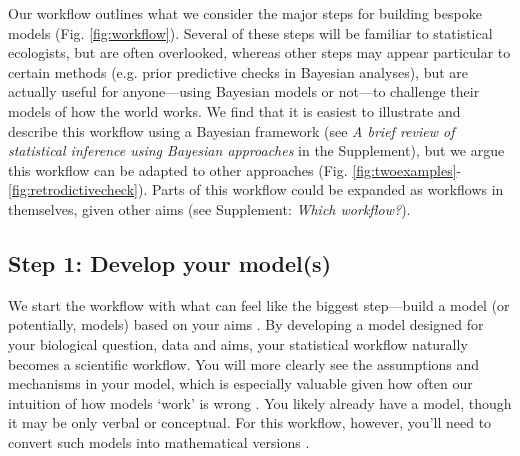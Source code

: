 \documentclass[11pt]{article}
\newcommand{\R}[1]{\label{}\linelabel{#1}}
\begin{document}
Our workflow outlines what we consider the major steps for building bespoke models (Fig. \ref{fig:workflow}). Several of these steps will be familiar to statistical ecologists, but are often overlooked, whereas other steps may appear particular to certain methods (e.g. prior predictive checks in Bayesian analyses), but are actually useful for anyone---using Bayesian models or not---to challenge their models of how the world works. We find that it is easiest to illustrate and describe \R{beyondMCMC2} this workflow using a Bayesian framework (see \emph{A brief review of statistical inference using Bayesian approaches} in the Supplement), but we argue this workflow can be adapted to other\R{beyondMCMC3} approaches (Fig. \ref{fig:twoexamples}-\ref{fig:retrodictivecheck}).
Parts of this workflow could be expanded as workflows in themselves, given other aims (see Supplement: \emph{Which workflow?}). %

\subsection*{Step 1: Develop your model(s)} 

We start the workflow with what can feel like the biggest step---build a model (or potentially, models) based on your aims \citep{hilborn2013ecological}. By developing a model designed for your biological question, data and aims, your statistical workflow naturally becomes a scientific workflow. You will more clearly see the assumptions and mechanisms in your model, which is especially valuable given how often our intuition of how models `work' is wrong \citep{kokko2005useful}. You likely already have a model, though it may be only verbal or conceptual. For this workflow, however, you’ll need to convert such models into mathematical versions \citep{servedio2014not}. %
\end{document}
